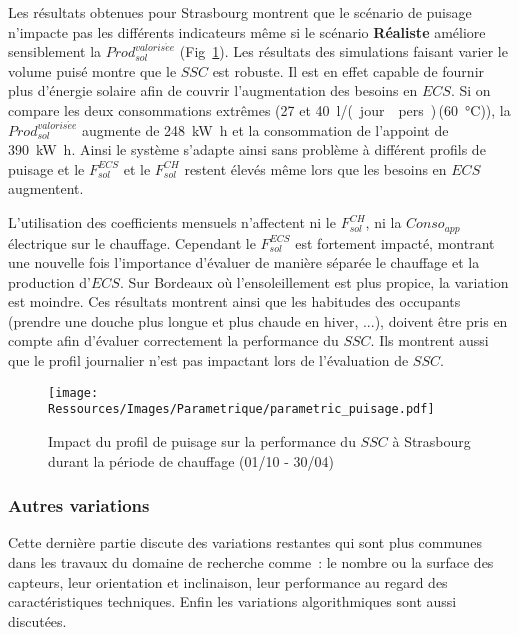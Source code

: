 Les résultats obtenues pour Strasbourg montrent que le scénario de puisage n’impacte pas
les différents indicateurs même si le scénario \textbf{Réaliste} améliore sensiblement la
$Prod_{sol}^{valoris\acute ee}$ (Fig~\ref{fig:impact_profil_puisage}). Les résultats des
simulations faisant varier le volume puisé montre que le $SSC$ est robuste. Il est en
effet capable de fournir plus d’énergie solaire afin de couvrir l’augmentation des besoins
en $ECS$. Si on compare les deux consommations extrêmes (\num{27} et
\SI{40}{\litre/(jour\period pers)}\,(\SI{60}{\celsius})), la $Prod_{sol}^{valoris\acute ee}$
augmente de \SI{248}{\kilo\watt\hour} et la consommation de l’appoint de \SI{390}{\kilo\watt\hour}.
Ainsi le système s’adapte ainsi sans problème à différent profils de puisage et le
$F_{sol}^{ECS}$ et le $F_{sol}^{CH}$ restent élevés même lors que les besoins en $ECS$ augmentent.

L’utilisation des coefficients mensuels n’affectent ni le $F_{sol}^{CH}$, ni la $Conso_{app}$
électrique sur le chauffage. Cependant le $F_{sol}^{ECS}$ est fortement impacté, montrant une
nouvelle fois l’importance d’évaluer de manière séparée le chauffage et la production
d’$ECS$. Sur Bordeaux où l’ensoleillement est plus propice, la variation est moindre. Ces
résultats montrent ainsi que les habitudes des occupants (prendre une douche plus longue
et plus chaude en hiver, ...), doivent être pris en compte afin d’évaluer correctement la
performance du $SSC$. Ils montrent aussi que le profil journalier n’est pas impactant lors
de l’évaluation de $SSC$.

\begin{figure}
    \begin{center}
        \texttt{[image: Ressources/Images/Parametrique/parametric\_puisage.pdf]}
    \end{center}
    \caption{Impact du profil de puisage sur la performance
             du $SSC$ à Strasbourg durant la période de chauffage (01/10 - 30/04)
             \label{fig:impact_profil_puisage}}
\end{figure}


\subsubsection{Autres variations} %
\label{ssub:autres_variations}
Cette dernière partie discute des variations restantes qui sont plus communes dans
les travaux du domaine de recherche comme~: le nombre ou la surface des capteurs, leur
orientation et inclinaison, leur performance au regard des caractéristiques techniques.
Enfin les variations algorithmiques sont aussi discutées.

